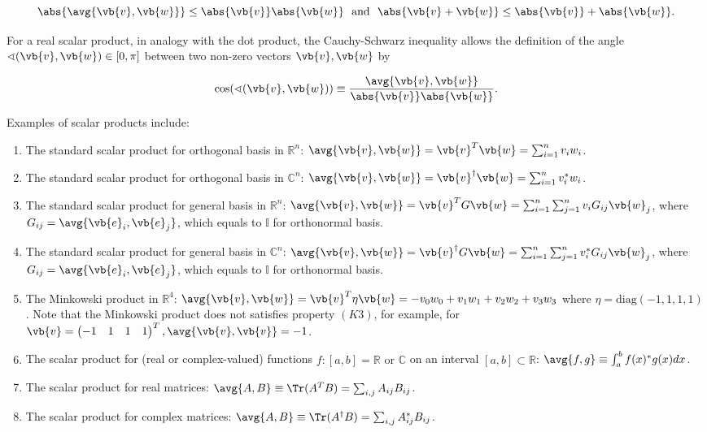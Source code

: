 \documentclass[a4paper,12pt]{report}
\begin{document}
\begin{equation}
    \abs{\avg{\vb{v} ,\vb{w} } } \le \abs{\vb{v} }\abs{\vb{w} } ~\text { and }~  \abs{\vb{v} + \vb{w} } \le \abs{\vb{v} } + \abs{\vb{w} }.      
\end{equation}


For a real scalar product, in analogy with the dot product, the Cauchy-Schwarz inequality allows the definition of the angle \(\sphericalangle (\vb{v} ,\vb{w} ) \in  [0,\pi ]\) between two non-zero vectors \(\vb{v} ,\vb{w} \) by

\begin{equation}
    \cos (\sphericalangle (\vb{v} ,\vb{w} )) \equiv \frac{\avg{\vb{v} ,\vb{w} } }{\abs{\vb{v} }\abs{\vb{w} }  }. 
\end{equation}


Examples of scalar products include:

\begin{enumerate}
    \item The standard scalar product for orthogonal basis in \(\mathbb{R}^{n} \): \(\avg{\vb{v} ,\vb{w} }  = \vb{v} ^T \vb{w} = \sum_{i=1}^{n} v_{i} w_{i} \).  
    \item The standard scalar product for orthogonal basis in \(\mathbb{C}^{n} \): \(\avg{\vb{v} ,\vb{w} } = \vb{v} ^{\dagger} \vb{w} = \sum_{i=1}^{n} v_{i}^*w_{i} \).
    \item The standard scalar product for general basis in \(\mathbb{R}^{n} \): \(\avg{\vb{v} ,\vb{w} } = \vb{v} ^T G\vb{w} = \sum_{i=1}^{n} \sum_{j=1}^{n}  v_{i}G_{ij}\vb{w} _{j}   \), where \(G_{ij} = \avg{\vb{e} _{i}, \vb{e} _{j}  }  \), which equals to \(\mathbb{I}\) for orthonormal basis.
    \item The standard scalar product for general basis in \(\mathbb{C}^{n} \): \(\avg{\vb{v} ,\vb{w} } = \vb{v} ^{\dagger}  G\vb{w} = \sum_{i=1}^{n} \sum_{j=1}^{n}  v_{i}^*G_{ij}\vb{w} _{j}   \), where \(G_{ij} = \avg{\vb{e} _{i}, \vb{e} _{j}  }  \), which equals to \(\mathbb{I}\) for orthonormal basis.
    \item The Minkowski product in \(\mathbb{R}^{4} \): \(\avg{\vb{v} ,\vb{w} } = \vb{v} ^{T} \eta \vb{w} = -v_0 w_0 + v_1 w_1 +v_2 w_2 +v_3 w_3    \) where \(\eta = \text{diag}  (-1,1,1,1)\). Note that the Minkowski product does not satisfies property \((K3)\), for example, for \(\vb{v} = \begin{pmatrix}
        -1 & 1 & 1 &  1 \\
    \end{pmatrix}^{T} , \avg{\vb{v} ,\vb{v} }  = -1\).
    \item The scalar product for (real or complex-valued) functions \(f: [a,b] = \mathbb{R}\text { or } \mathbb{C}\) on an interval \([a,b] \subset \mathbb{R}\): \(\avg{f,g} \equiv \int_{a}^{b} f(x)^{*} g(x)dx\). 
    \item The scalar product for real matrices: \(\avg{A, B} \equiv \Tr (A^{T}B ) = \sum_{i,j}^{} A_{ij} B_{ij}\).
    \item The scalar product for complex matrices: \(\avg{A, B} \equiv \Tr (A^{\dagger} B ) = \sum_{i,j}^{} A_{ij}^* B_{ij}\).
\end{enumerate}
\end{document}
